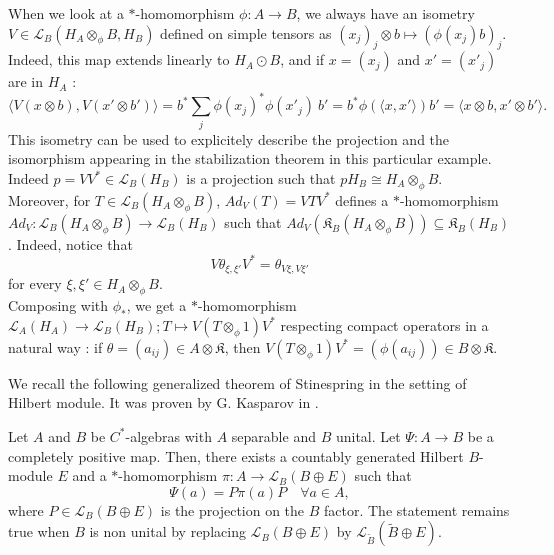 \begin{rk}\label{isometry}
When we look at a $*$-homomorphism $\phi : A\rightarrow B$, we always have an isometry $V\in \mathcal L_B ( H_A\otimes_\phi B , H_B)$ defined on simple tensors as $(x_j)_j\otimes b \mapsto (\phi(x_j)b)_j$. Indeed, this map extends linearly to $H_A \odot B$, and if $x = (x_j)$ and $x'=(x'_j)$ are in $H_A$ : 
\[\langle V (x\otimes b) , V(x'\otimes b')\rangle = b^* \sum_j \phi(x_j)^* \phi(x'_j) \  b' = b^*\phi(\langle x, x' \rangle)b' = \langle x\otimes b , x'\otimes b' \rangle . \] %
This isometry can be used to explicitely describe the projection and the isomorphism appearing in the stabilization theorem in this particular example. Indeed $p = VV^*\in\mathcal L_B(H_B)$ is a projection such that $p H_B \cong H_A\otimes_\phi B $.\\

Moreover, for $T\in \mathcal L_B(H_A\otimes_\phi B)$, $Ad_V(T) = VTV^*$ defines a $*$-homomorphism $Ad_V : \mathcal L_B(H_A\otimes_\phi B)\rightarrow \mathcal L_B(H_B)$ such that $Ad_V(\mathfrak K_B(H_A\otimes_\phi B))\subseteq \mathfrak K_B(H_B)$. Indeed, notice that 
\[V\theta_{\xi,\xi'}V^* = \theta_{V\xi,V\xi'}\]
for every $\xi,\xi'\in H_A\otimes_\phi B$.\\

Composing with $\phi_*$, we get a $*$-homomorphism $\mathcal L_A(H_A)\rightarrow \mathcal L_B(H_B); T\mapsto V(T\otimes_\phi 1)V^*$ respecting compact operators in a natural way : if $\theta = (a_{ij})\in A\otimes\mathfrak K$, then $V(T\otimes_\phi 1)V^* = (\phi(a_{ij}))\in B\otimes\mathfrak K$.  
\end{rk}

We recall the following generalized theorem of Stinespring in the setting of Hilbert module. It was proven by G. Kasparov in \cite{KasparovStinespring}.

\begin{thm} \label{KasparovStinespring} Let $A$ and $B$ be $C^*$-algebras with $A$ separable and $B$ unital. Let $\Psi : A \rightarrow B$ be a completely positive map. Then, there exists a countably generated Hilbert $B$-module $E$ and a $*$-homomorphism $\pi : A \rightarrow \mathcal L_B (B\oplus E)$ such that
\[\Psi( a) = P \pi(a) P \quad \forall a\in A,\]
where $P\in\mathcal L_B(B\oplus E)$ is the projection on the $B$ factor. The statement remains true when $B$ is non unital by replacing $\mathcal L_B (B\oplus E)$ by $\mathcal L_{\tilde B} (\tilde{B}\oplus E)$.
\end{thm}
